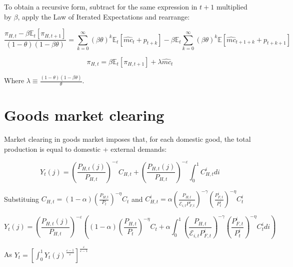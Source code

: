 \documentclass{article}
\newcommand{\Et}{\mathbb{E}_t}
\begin{document}
To obtain a recursive form, subtract for the same expression in $t+1$ multiplied by $\beta$, apply the Law of Iterated Expectations and rearrange:

\begin{equation}
    \frac{\pi_{H,t} - \beta \Et[\pi_{H,t+1}]}{(1-\theta)(1-\beta \theta) } = \sum^\infty_{k=0} (\beta \theta)^k \Et[\hat{mc}_t + p_{t+k}]  - \beta \Et \sum^\infty_{k=0} (\beta \theta)^k  \mathbb E[\hat{mc}_{t+1+k} + p_{t+k+1}] 
\end{equation}


\begin{equation}
    \pi_{H,t} = \beta \Et[\pi_{H,t+1}] + \lambda \hat{mc}_t
\end{equation}

Where $\lambda \equiv \frac{(1-\theta) (1 - \beta \theta)}{\theta}$.

\section{Goods market clearing}
Market clearing in goods market imposes that, for each domestic good, the total production is equal to domestic + external demands:

\begin{equation}
    Y_{t}(j) = \left( \frac{P_{H,t}(j)}{P_{H,t}} \right)^{-\varepsilon} C_{H,t} + \left( \frac{P_{H,t}(j)}{P_{H,t}} \right)^{-\varepsilon} \int_0^1 C^i_{H, t} di
\end{equation}

Substituing $C_{H,t} = (1-\alpha) \left( \frac{P_{H,t}}{P_t} \right)^{-\eta} C_t$ and $C^i_{H,t} = \alpha \left( \frac{P_{H,t}}{\mathcal{E}_{i,t} P^i_{F,t}} \right)^{-\gamma} \left( \frac{P^i_{F,t}}{P^i_{t}} \right)^{-\eta} C^i_t$

\begin{equation}
    Y_{t}(j) = \left( \frac{P_{H,t}(j)}{P_{H,t}} \right)^{-\varepsilon} \left((1-\alpha) \left( \frac{P_{H,t}}{P_t} \right)^{-\eta} C_t +  \alpha \int_0^1 \left( \frac{P_{H,t}}{\mathcal{E}_{i,t} P^i_{F,t}} \right)^{-\gamma} \left( \frac{P^i_{F,t}}{P^i_{t}} \right)^{-\eta} C^i_t di \right)
\end{equation}

As $Y_t = \left[\int^1_0 Y_t(j)^{\frac{\varepsilon-1}{\varepsilon}} \right]^\frac{\varepsilon}{\varepsilon-1}$
\end{document}
